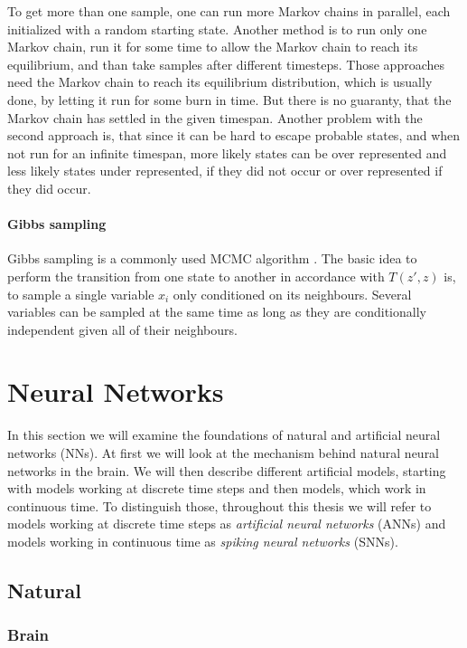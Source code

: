 To get more than one sample, one can run more Markov chains in parallel, each initialized with a random starting state. 
Another method is to run only one Markov chain, run it for some time to allow the Markov chain to reach its equilibrium, and than take samples after different timesteps.
Those approaches need the Markov chain to reach its equilibrium distribution, which is usually done, by letting it run for some burn in time.
But there is no guaranty, that the Markov chain has settled in the given timespan.    
Another problem with the second approach is, that since it can be hard to escape probable states, and when not run for an infinite timespan, more likely states can be over represented and less likely states under represented, if they did not occur or over represented if they did occur.  

\paragraph{Gibbs sampling} Gibbs sampling is a commonly used MCMC algorithm \cite{Goodfellow-et-al-2016-Book}. The basic idea to perform the transition from one state to another in accordance with $T(z',z)$ is, to sample a single variable $x_i$ only conditioned on its neighbours. 
Several variables can be sampled at the same time as long as they are conditionally independent given all of their neighbours.

\section{Neural Networks} \label{c:NNs}

In this section we will examine the foundations of natural and artificial neural networks (NNs).
At first we will look at the mechanism behind natural neural networks in the brain.
We will then describe different artificial models, starting with models working at discrete time steps and then models, which work in continuous time.
To distinguish those, throughout this thesis we will refer to models working at discrete time steps as \textit{artificial neural networks} (ANNs) and models working in continuous time as \textit{spiking neural networks} (SNNs).

\subsection{Natural} \label{c:natural}
\subsubsection{Brain} \label{c:brain}

